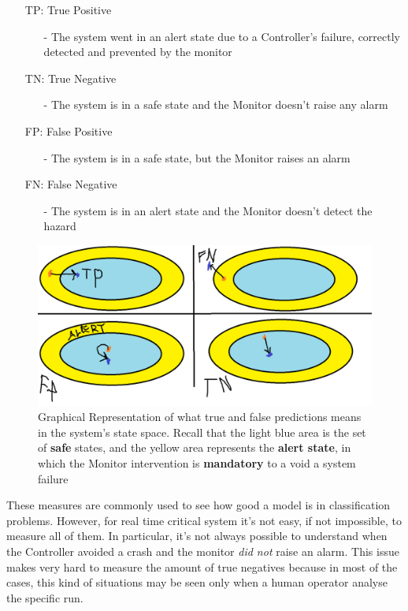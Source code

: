 \begin{itemize}
	\item[TP:] True Positive
	\begin{itemize}
		\item[-] The system went in an alert state due to a Controller's failure, correctly detected and prevented by the monitor
	\end{itemize}
	\item[TN:] True Negative
	\begin{itemize}
		\item[-] The system is in a safe state and the Monitor doesn't raise any alarm
	\end{itemize}
	\item[FP:] False Positive
	\begin{itemize}
		\item[-] The system is in a safe state, but the Monitor raises an alarm
	\end{itemize}
	\item[FN:] False Negative
	\begin{itemize}
		\item[-] The system is in an alert state and the Monitor doesn't detect the hazard
	\end{itemize}
\end{itemize}


\begin{figure}[h!]
	\includegraphics[width=\textwidth]{img/positive-negative.png}
	\caption{Graphical Representation of what true and false predictions means in the system's state space. Recall that the light blue area is the set of \textbf{safe} states, and the yellow area represents the \textbf{alert state}, in which the Monitor intervention is \textbf{mandatory} to a void a system failure}
\end{figure}


These measures are commonly used to see how good a model is in classification problems. However, for real time critical system it's not easy, if not impossible, to measure all of them. In particular, it's not always possible to understand when the Controller avoided a crash and the monitor \textsl{did not} raise an alarm. This issue makes very hard to measure the amount of true negatives because in most of the cases, this kind of situations may be seen only when a human operator analyse the specific run.

